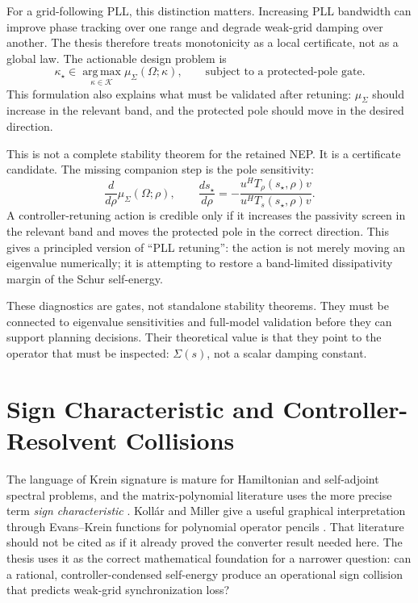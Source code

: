 For a grid-following PLL, this distinction matters. Increasing PLL bandwidth can
improve phase tracking over one range and degrade weak-grid damping over another.
The thesis therefore treats monotonicity as a local certificate, not as a global
law. The actionable design problem is
\begin{equation}
  \kappa_\star\in
  \operatorname*{arg\,max}_{\kappa\in\mathcal K}
  \mu_\Sigma(\Omega;\kappa),
  \qquad
  \text{subject to a protected-pole gate.}
  \label{eq:self_passivity_optimal_kappa}
\end{equation}
This formulation also explains what must be validated after retuning:
\(\mu_\Sigma\) should increase in the relevant band, and the protected pole
should move in the desired direction.

This is not a complete stability theorem for the retained NEP. It is a
certificate candidate. The missing companion step is the pole sensitivity:
\begin{equation}
  \frac{d}{d\rho}\mu_\Sigma(\Omega;\rho),
  \qquad
  \frac{ds_\star}{d\rho}
  =
  -\frac{u^H T_\rho(s_\star,\rho)v}
  {u^H T_s(s_\star,\rho)v}.
  \label{eq:self_passivity_retuning}
\end{equation}
A controller-retuning action is credible only if it increases the passivity
screen in the relevant band and moves the protected pole in the correct
direction. This gives a principled version of ``PLL retuning'': the action is
not merely moving an eigenvalue numerically; it is attempting to restore a
band-limited dissipativity margin of the Schur self-energy.

These diagnostics are gates, not standalone stability theorems. They must be
connected to eigenvalue sensitivities and full-model validation before they can
support planning decisions. Their theoretical value is that they point to the
operator that must be inspected: \(\Sigma(s)\), not a scalar damping constant.

\section{Sign Characteristic and Controller-Resolvent Collisions}

The language of Krein signature is mature for Hamiltonian and self-adjoint
spectral problems, and the matrix-polynomial literature uses the more precise
term \emph{sign characteristic} \cite{gohberg1982matrixpolynomials,
gohberg1983meromorphic,mehrmann2016sign}. Kollár and Miller give a useful
graphical interpretation through Evans--Krein functions for polynomial operator
pencils \cite{kollar2014graphical}. That literature should not be cited as if it
already proved the converter result needed here. The thesis uses it as the
correct mathematical foundation for a narrower question: can a rational,
controller-condensed self-energy produce an operational sign collision that
predicts weak-grid synchronization loss?

